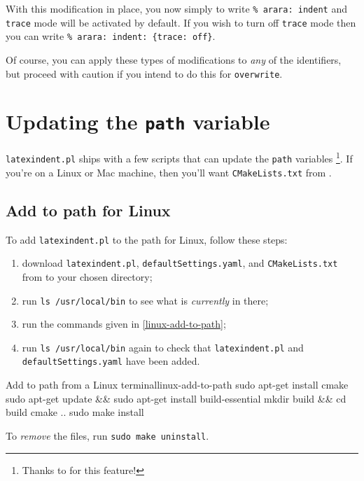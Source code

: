 \documentclass[11pt]{article}
\begin{document}
With this modification in place, you now simply to write \lstinline!% arara: indent! and
\lstinline!trace! mode will be activated by default. If you wish to turn off \lstinline!trace!
mode then you can write \lstinline!% arara: indent: {trace: off}!.

Of course, you can apply these types of modifications to \emph{any} of the identifiers,
but proceed with caution if you intend to do this for \lstinline!overwrite!.

\section{Updating the \lstinline!path! variable}\label{sec:updating-path}
 \lstinline!latexindent.pl! ships with a few scripts that can update the \lstinline!path! variables
 \footnote{Thanks to \cite{jasjuang} for this feature!}. If you're 
 on a Linux or Mac machine, then you'll want \lstinline!CMakeLists.txt! from \cite{latexindent-home}.
 \subsection{Add to path for Linux}
 To add \lstinline!latexindent.pl! to the path for Linux, follow these steps:
 \begin{enumerate}
   \item download  \lstinline!latexindent.pl!, \lstinline!defaultSettings.yaml!,  and \lstinline!CMakeLists.txt! 
     from \cite{latexindent-home} to your chosen directory;
   \item run \lstinline!ls /usr/local/bin! to see what is \emph{currently} in there;
   \item run the commands given in \cref{linux-add-to-path};
   \item run \lstinline!ls /usr/local/bin! again to check that \lstinline!latexindent.pl! and \lstinline!defaultSettings.yaml!
     have been added.
 \end{enumerate}
\begin{cmhlistings}[style=yaml,numbers=none]{Add to path from a Linux terminal}{linux-add-to-path}
sudo apt-get install cmake
sudo apt-get update && sudo apt-get install build-essential
mkdir build && cd build
cmake ..
sudo make install
\end{cmhlistings}
To \emph{remove} the files, run \lstinline!sudo make uninstall!.
\end{document}
